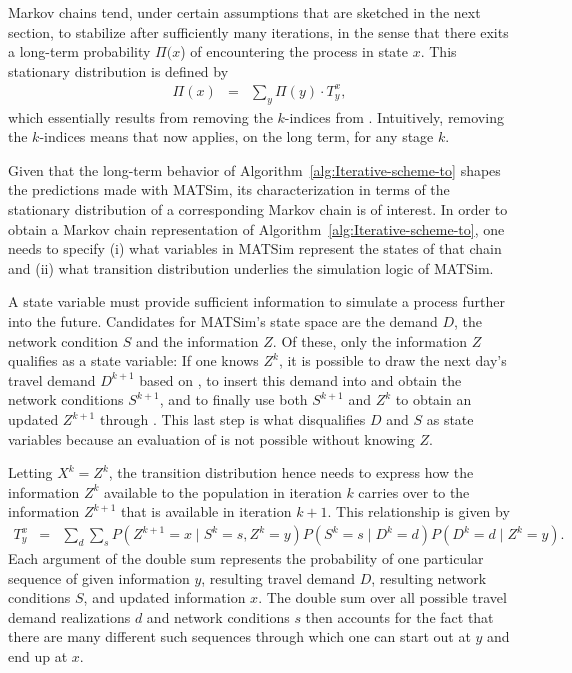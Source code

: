 Markov chains tend, under certain assumptions that are sketched in
the next section, to stabilize after sufficiently many iterations,
in the sense that there exits a long-term probability $\Pi(x$) of
encountering the process in state $x$. This stationary distribution
is defined by
\begin{eqnarray}
\Pi(x) & = & \sum_{y}\Pi(y)\cdot T_{y}^{x},\label{eq:mc-stationary}
\end{eqnarray}
which essentially results from removing the $k$-indices from .
Intuitively, removing the $k$-indices means that 
now applies, on the long term, for any stage $k$.

Given that the long-term behavior of Algorithm~\ref{alg:Iterative-scheme-to}
shapes the predictions made with MATSim, its characterization in terms
of the stationary distribution of a corresponding Markov chain is
of interest. In order to obtain a Markov chain representation of Algorithm~\ref{alg:Iterative-scheme-to},
one needs to specify (i) what variables in MATSim represent the states
of that chain and (ii) what transition distribution underlies the
simulation logic of MATSim.

A state variable must provide sufficient information to simulate a
process further into the future. Candidates for MATSim's state space
are the demand $D$, the network condition $S$ and the information
$Z$. Of these, only the information $Z$ qualifies as a state variable:
If one knows $Z^{k}$, it is possible to draw the next day's travel
demand $D^{k+1}$ based on , to insert this
demand into  and obtain the network
conditions $S^{k+1}$, and to finally use both $S^{k+1}$ and $Z^{k}$
to obtain an updated $Z^{k+1}$ through .
This last step is what disqualifies $D$ and $S$ as state variables
because an evaluation of  is not possible
without knowing $Z$.

Letting $X^{k}=Z^{k}$, the transition distribution hence needs to
express how the information $Z^{k}$ available to the population in
iteration $k$ carries over to the information $Z^{k+1}$ that is
available in iteration $k+1$. This relationship is given by
\begin{eqnarray}
T_{y}^{x} & = & \sum_{d}\sum_{s}P(Z^{k+1}=x\mid S^{k}=s,Z^{k}=y)P(S^{k}=s\mid D^{k}=d)P(D^{k}=d\mid Z^{k}=y).\label{eq:matsim-transition-distr}
\end{eqnarray}
Each argument of the double sum represents the probability of one
particular sequence of given information $y$, resulting travel demand
$D$, resulting network conditions $S$, and updated information $x$.
The double sum over all possible travel demand realizations $d$ and
network conditions $s$ then accounts for the fact that there are
many different such sequences through which one can start out at $y$
and end up at $x$.

